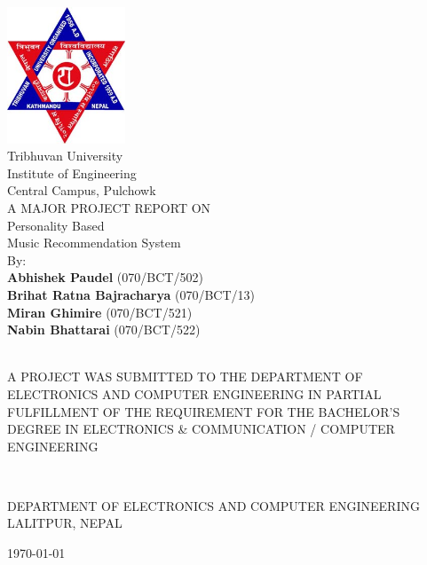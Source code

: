 

\thispagestyle{empty} %



{
  \thispagestyle{empty}
  \centering
  \normalsize

  \includegraphics[height=1.6in]{fig/tu-logo}\\
  {\Large\sc Tribhuvan University}\\
  {\Large\sc Institute of Engineering}\\
  Central Campus, Pulchowk
  \\[1.5cm]

  A MAJOR PROJECT REPORT ON\\
  {\Huge\sc Personality Based \\[5pt] Music Recommendation System}\\[1cm]

  By:\\
  {\bf Abhishek Paudel} (070/BCT/502)\\
  {\bf Brihat Ratna Bajracharya} (070/BCT/13)\\
  {\bf Miran Ghimire} (070/BCT/521)\\
	{\bf Nabin Bhattarai} (070/BCT/522)\\

  ~

  A PROJECT WAS SUBMITTED TO THE DEPARTMENT OF ELECTRONICS AND COMPUTER
  ENGINEERING IN PARTIAL FULFILLMENT OF THE REQUIREMENT FOR THE BACHELOR'S
  DEGREE IN ELECTRONICS \& COMMUNICATION / COMPUTER ENGINEERING

  ~

  DEPARTMENT OF ELECTRONICS AND COMPUTER ENGINEERING\\
  LALITPUR, NEPAL

  \vfill
  \large
	\today

}

